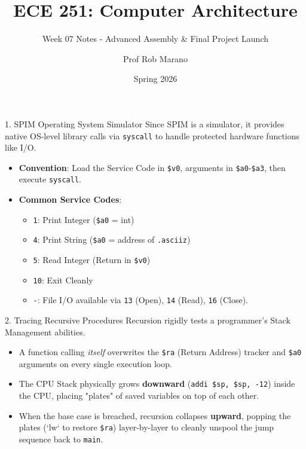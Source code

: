 \documentclass[aspectratio=169]{beamer}
\title{ECE 251: Computer Architecture}
\subtitle{Week 07 Notes - Advanced Assembly \& Final Project Launch}
\author{Prof Rob Marano}
\date{Spring 2026}
\begin{document}
\frame{\titlepage}

\begin{frame}{1. SPIM Operating System Simulator}
Since SPIM is a simulator, it provides native OS-level library calls via \texttt{syscall} to handle protected hardware functions like I/O.
\vspace{0.2cm}
\begin{itemize}
    \item \textbf{Convention}: Load the Service Code in \texttt{\$v0}, arguments in \texttt{\$a0}-\texttt{\$a3}, then execute \texttt{syscall}.
    \item \textbf{Common Service Codes}:
    \begin{itemize}
        \item \texttt{1}: Print Integer (\texttt{\$a0} = int)
        \item \texttt{4}: Print String (\texttt{\$a0} = address of \texttt{.asciiz})
        \item \texttt{5}: Read Integer (Return in \texttt{\$v0})
        \item \texttt{10}: Exit Cleanly
        \item \texttt{-}: File I/O available via \texttt{13} (Open), \texttt{14} (Read), \texttt{16} (Close).
    \end{itemize}
\end{itemize}
\end{frame}

\begin{frame}{2. Tracing Recursive Procedures}
Recursion rigidly tests a programmer's Stack Management abilities.
\vspace{0.2cm}
\begin{itemize}
    \item A function calling \textit{itself} overwrites the \texttt{\$ra} (Return Address) tracker and \texttt{\$a0} arguments on every single execution loop.
    \item The CPU Stack physically grows \textbf{downward} (\texttt{addi \$sp, \$sp, -12}) inside the CPU, placing "plates" of saved variables on top of each other.
    \item When the base case is breached, recursion collapses \textbf{upward}, popping the plates (`lw` to restore \texttt{\$ra}) layer-by-layer to cleanly unspool the jump sequence back to \texttt{main}.
\end{itemize}
\end{frame}
\end{document}
